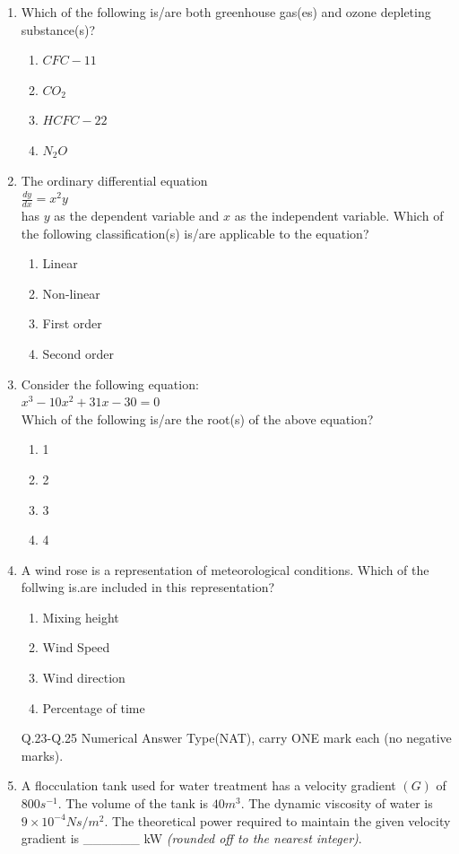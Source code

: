 \documentclass[journal]{IEEEtran}
\begin{document}
\begin{enumerate}[start=1]
\item Which of the following is/are both greenhouse gas(es) and ozone depleting substance(s)?
\hfill{}
\begin{enumerate}
    \item $CFC-11$
    \item $CO_2$
    \item $HCFC-22$
    \item $N_2O$
\end{enumerate}

\item The ordinary differential equation\\ $\frac{dy}{dx} = x^2y$ \\ has $y$ as the dependent variable and $x$ as the independent variable. Which of the following classification(s) is/are applicable to the equation?
\hfill{}
\begin{enumerate}
    \item Linear
    \item Non-linear
    \item First order
    \item Second order
\end{enumerate}

\item Consider the following equation:  \\ $x^3-10x^2+31x-30 = 0$ \\ Which of the following is/are the root(s) of the above equation?
\hfill{}
\begin{enumerate}
    \item 1
    \item 2
    \item 3
    \item 4
\end{enumerate}

\item A wind rose is a representation of meteorological conditions. Which of the follwing is.are included in this representation?
\hfill{}
\begin{enumerate}
    \item Mixing height
    \item Wind Speed
    \item Wind direction
    \item Percentage of time
\end{enumerate}
\bigskip

Q.23-Q.25 Numerical Answer Type(NAT), carry ONE mark each (no negative marks).
\\
\item A flocculation tank used for water treatment has a velocity gradient $(G)$ of $800 s^{-1}$. The volume of the tank is $40 m^3$. The dynamic viscosity of water is $9\times10^{-4} Ns/m^2$. The theoretical power required to maintain the given velocity gradient is \_\_\_\_\_\_ kW \textit{(rounded off to the nearest integer)}.
\hfill{}


\end{enumerate}
\end{document}
